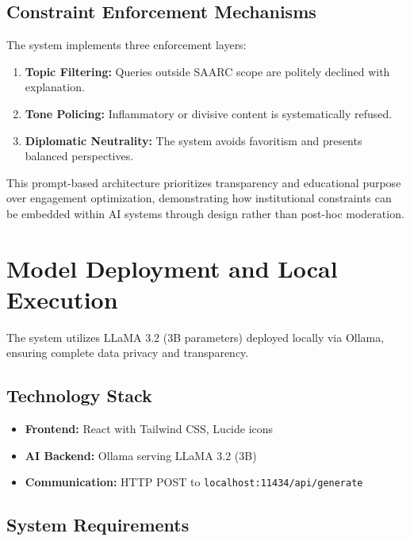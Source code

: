 \documentclass[12pt,a4paper]{report}
\begin{document}
\subsection{Constraint Enforcement Mechanisms}

The system implements three enforcement layers:

\begin{enumerate}
    \item \textbf{Topic Filtering:} Queries outside SAARC scope are politely declined with explanation.
    \item \textbf{Tone Policing:} Inflammatory or divisive content is systematically refused.
    \item \textbf{Diplomatic Neutrality:} The system avoids favoritism and presents balanced perspectives.
\end{enumerate}

This prompt-based architecture prioritizes transparency and educational purpose over engagement optimization, demonstrating how institutional constraints can be embedded within AI systems through design rather than post-hoc moderation.


\section{Model Deployment and Local Execution}

The system utilizes LLaMA 3.2 (3B parameters) deployed locally via Ollama, ensuring complete data privacy and transparency.

\subsection{Technology Stack}

\begin{itemize}
    \item \textbf{Frontend:} React with Tailwind CSS, Lucide icons
    \item \textbf{AI Backend:} Ollama serving LLaMA 3.2 (3B)
    \item \textbf{Communication:} HTTP POST to \texttt{localhost:11434/api/generate}
\end{itemize}

\subsection{System Requirements}
\end{document}
